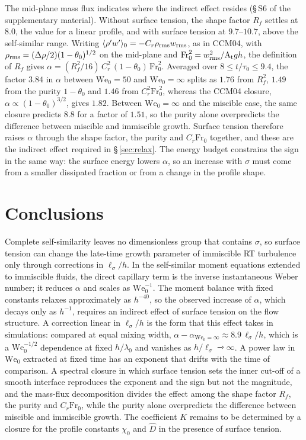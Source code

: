 \documentclass[lineno]{jfm}
\newcommand{\avg}[1]{\langle #1\rangle}
\newcommand{\At}{\mathrm{A_t}}
\newcommand{\We}{\mathrm{We}_0}
\newcommand{\lls}{\ell_\sigma}
\begin{document}
The mid-plane mass flux indicates where the indirect effect resides (\S\,S6 of the supplementary material). Without surface tension, the shape factor $R_f$ settles at $8.0$, the value for a linear profile, and with surface tension at $9.7$--$10.7$, above the self-similar range. Writing $\avg{\rho' w'}_0 = -C_r \rho_{\rm rms} w_{\rm rms}$, as in CCM04, with $\rho_{\rm rms} = (\Delta \rho/2)(1 - \theta_0)^{1/2}$ on the mid-plane and $\mathrm{Fr}_0^2 = w_{\rm rms}^2/\At g h$, the definition of $R_f$ gives $\alpha = (R_f^2/16) \, C_r^2 \,(1 - \theta_0) \, \mathrm{Fr}_0^2$. Averaged over $8 \le t/\tau_0 \le 9.4$, the factor $3.84$ in $\alpha$ between $\We = 50$ and $\We = \infty$ splits as $1.76$ from $R_f^2$, $1.49$ from the purity $1 - \theta_0$ and $1.46$ from $C_r^2 \mathrm{Fr}_0^2$, whereas the CCM04 closure, $\alpha \propto (1 - \theta_0)^{3/2}$, gives $1.82$. Between $\We = \infty$ and the miscible case, the same closure predicts $8.8$ for a factor of $1.51$, so the purity alone overpredicts the difference between miscible and immiscible growth. Surface tension therefore raises $\alpha$ through the shape factor, the purity and $C_r \mathrm{Fr}_0$ together, and these are the indirect effect required in \S\,\ref{sec:relax}. The energy budget constrains the sign in the same way: the surface energy lowers $\alpha$, so an increase with $\sigma$ must come from a smaller dissipated fraction or from a change in the profile shape.

\section{Conclusions}\label{sec:conclusions}

Complete self-similarity leaves no dimensionless group that contains $\sigma$, so surface tension can change the late-time growth parameter of immiscible RT turbulence only through corrections in $\lls/h$. In the self-similar moment equations extended to immiscible fluids, the direct capillary term is the inverse instantaneous Weber number; it reduces $\alpha$ and scales as $\We^{-1}$. The moment balance with fixed constants relaxes approximately as $h^{-40}$, so the observed increase of $\alpha$, which decays only as $h^{-1}$, requires an indirect effect of surface tension on the flow structure. A correction linear in $\lls/h$ is the form that this effect takes in simulations: compared at equal mixing width, $\alpha - \alpha_{\We = \infty} \approx 8.9 \, \lls/h$, which is a $\We^{-1/2}$ dependence at fixed $h/\lambda_0$ and vanishes as $h/\lls \rightarrowtriangle \infty$. A power law in $\We$ extracted at fixed time has an exponent that drifts with the time of comparison. A spectral closure in which surface tension sets the inner cut-off of a smooth interface reproduces the exponent and the sign but not the magnitude, and the mass-flux decomposition divides the effect among the shape factor $R_f$, the purity and $C_r \mathrm{Fr}_0$, while the purity alone overpredicts the difference between miscible and immiscible growth. The coefficient $K$ remains to be determined by a closure for the profile constants $\chi_0$ and $\hat D$ in the presence of surface tension.
\end{document}
